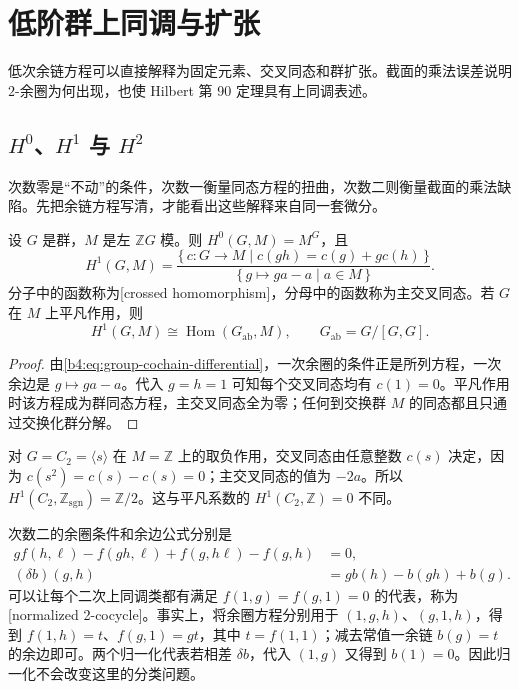 
\section{低阶群上同调与扩张}
\label{b4:sec:1102}

低次余链方程可以直接解释为固定元素、交叉同态和群扩张。截面的乘法误差说明\(2\)-余圈为何出现，也使 Hilbert 第 90 定理具有上同调表述。

%
%

\subsection{\texorpdfstring{\(H^0\)、\(H^1\) 与 \(H^2\)}{H0、H1 与 H2}}
\label{b4:subsec:1102:01}

次数零是“不动”的条件，次数一衡量同态方程的扭曲，次数二则衡量截面的乘法缺陷。先把余链方程写清，才能看出这些解释来自同一套微分。

\begin{proposition}\label{b4:prop:group-first-cohomology}
设 \(G\) 是群，\(M\) 是左 \(\mathbb ZG\) 模。则 \(H^0(G,M)=M^G\)，且
\[
H^1(G,M)=
\frac{\{\,c:G\to M\mid c(gh)=c(g)+g c(h)\,\}}
{\{\,g\mapsto ga-a\mid a\in M\,\}}.
\]
分子中的函数称为[crossed homomorphism]，分母中的函数称为主交叉同态。若 \(G\) 在 \(M\) 上平凡作用，则
\[
H^1(G,M)\cong\operatorname{Hom}(G_{\mathrm{ab}},M),
\qquad G_{\mathrm{ab}}=G/[G,G].
\]
\end{proposition}
\begin{proof}
由\eqref{b4:eq:group-cochain-differential}，一次余圈的条件正是所列方程，一次余边是 \(g\mapsto ga-a\)。代入 \(g=h=1\) 可知每个交叉同态均有 \(c(1)=0\)。平凡作用时该方程成为群同态方程，主交叉同态全为零；任何到交换群 \(M\) 的同态都且只通过交换化群分解。
\end{proof}

对 \(G=C_2=\langle s\rangle\) 在 \(M=\mathbb Z\) 上的取负作用，交叉同态由任意整数 \(c(s)\) 决定，因为 \(c(s^2)=c(s)-c(s)=0\)；主交叉同态的值为 \(-2a\)。所以 \(H^1(C_2,\mathbb Z_{\mathrm{sgn}})=\mathbb Z/2\)。这与平凡系数的 \(H^1(C_2,\mathbb Z)=0\) 不同。

\ProseParagraphBreak
次数二的余圈条件和余边公式分别是
\begin{align}
g f(h,\ell)-f(gh,\ell)+f(g,h\ell)-f(g,h)&=0,
\label{b4:eq:group-two-cocycle}\\
(\delta b)(g,h)&=g b(h)-b(gh)+b(g).
\label{b4:eq:group-two-coboundary}
\end{align}
可以让每个二次上同调类都有满足 \(f(1,g)=f(g,1)=0\) 的代表，称为[normalized 2-cocycle]。事实上，将余圈方程分别用于 \((1,g,h)\)、\((g,1,h)\)，得到 \(f(1,h)=t\)、\(f(g,1)=gt\)，其中 \(t=f(1,1)\)；减去常值一余链 \(b(g)=t\) 的余边即可。两个归一化代表若相差 \(\delta b\)，代入 \((1,g)\) 又得到 \(b(1)=0\)。因此归一化不会改变这里的分类问题。

